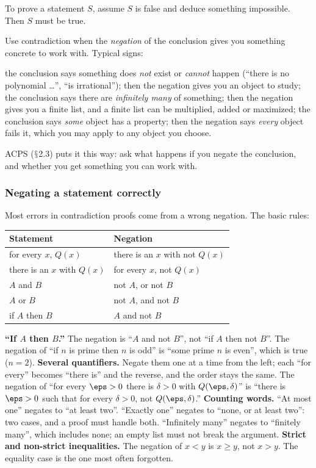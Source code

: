 \documentclass[10pt]{scrartcl}
\renewcommand{\S}{\ensuremath{\mathsection}}
\begin{document}
To prove a statement $S$, assume $S$ is false and deduce something impossible. Then $S$ must be true.

Use contradiction when the \emph{negation} of the conclusion gives you something concrete to work with. Typical signs:
\begin{itemize}
  \ii the conclusion says something does \emph{not} exist or \emph{cannot} happen (``there is no polynomial \ldots'', ``is irrational''); then the negation gives you an object to study;
  \ii the conclusion says there are \emph{infinitely many} of something; then the negation gives you a finite list, and a finite list can be multiplied, added or maximized;
  \ii the conclusion says \emph{some} object has a property; then the negation says \emph{every} object fails it, which you may apply to any object you choose.
\end{itemize}
ACPS (\S2.3) puts it this way: ask what happens if you negate the conclusion, and whether you get something you can work with.

\subsubsection*{Negating a statement correctly}
Most errors in contradiction proofs come from a wrong negation. The basic rules:
\begin{center}
\begin{tabular}{ll}
  \toprule
  \textbf{Statement} & \textbf{Negation} \\
  \midrule
  for every $x$, $Q(x)$ & there is an $x$ with not $Q(x)$ \\
  there is an $x$ with $Q(x)$ & for every $x$, not $Q(x)$ \\
  $A$ and $B$ & not $A$, or not $B$ \\
  $A$ or $B$ & not $A$, and not $B$ \\
  if $A$ then $B$ & $A$ and not $B$ \\
  \bottomrule
\end{tabular}
\end{center}

\begin{trapbox}
  \ii \textbf{``If $A$ then $B$.''} The negation is ``$A$ and not $B$'', not ``if $A$ then not $B$''. The negation of ``if $n$ is prime then $n$ is odd'' is ``some prime $n$ is even'', which is true ($n = 2$).
  \ii \textbf{Several quantifiers.} Negate them one at a time from the left; each ``for every'' becomes ``there is'' and the reverse, and the order stays the same. The negation of ``for every $\eps > 0$ there is $\delta > 0$ with $Q(\eps,\delta)$'' is ``there is $\eps > 0$ such that for every $\delta > 0$, not $Q(\eps,\delta)$.''
  \ii \textbf{Counting words.} ``At most one'' negates to ``at least two''. ``Exactly one'' negates to ``none, or at least two'': two cases, and a proof must handle both. ``Infinitely many'' negates to ``finitely many'', which includes none; an empty list must not break the argument.
  \ii \textbf{Strict and non-strict inequalities.} The negation of $x < y$ is $x \geq y$, not $x > y$. The equality case is the one most often forgotten.
\end{trapbox}
\end{document}
